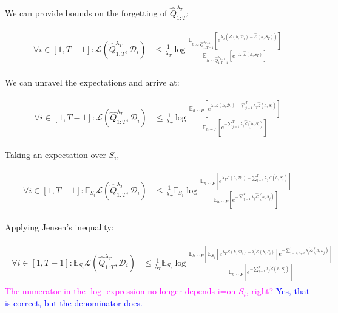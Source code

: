 \documentclass[letterpaper]{article}
\theoremstyle{definition}
\newcommand{\RM}[1]{{\textcolor{magenta}{#1}}}
\newcommand{\LF}[1]{{\textcolor{blue}{#1}}}
\begin{document}
We can provide bounds on the forgetting of $\hat{Q}^{\lambda_T}_{1:T}$:


\begin{align*} 
\begin{split}
\forall i\in[1,T-1]:
\mathcal{L}(\hat{Q}^{\lambda_T}_{1:T}, \mathcal{D}_i) &\leq \frac{1}{\lambda_T}\log\frac{\mathbb{E}_{h\sim \hat{Q}^{\lambda_{T-1}}_{1:T-1}}\left [e^{\lambda_T(\mathcal{L}(h,\mathcal{D}_i)-\hat{\mathcal{L}}(h,S_T))} \right ]}{\mathbb{E}_{h\sim \hat{Q}^{\lambda_{T-1}}_{1:T-1}}\left [e^{-\lambda_T\hat{\mathcal{L}}(h,S_T)} \right ]}
\end{split}
\end{align*}

We can unravel the expectations and arrive at:

\begin{align*} 
\begin{split}
\forall i\in[1,T-1]:
\mathcal{L}(\hat{Q}^{\lambda_T}_{1:T}, \mathcal{D}_i) &\leq \frac{1}{\lambda_T}\log\frac{\mathbb{E}_{h\sim P}\left [e^{\lambda_T\mathcal{L}(h,\mathcal{D}_i)-\sum_{j=1}^{T}\lambda_j\hat{\mathcal{L}}(h,S_j)} \right ]}{\mathbb{E}_{h\sim P}\left [e^{-\sum_{j=1}^{T}\lambda_j\hat{\mathcal{L}}(h,S_j)} \right ]}
\end{split}
\end{align*}

Taking an expectation over $S_i$,

\begin{align*} 
\begin{split}
\forall i\in[1,T-1]:
\mathbb{E}_{S_i}\mathcal{L}(\hat{Q}^{\lambda_T}_{1:T}, \mathcal{D}_i) &\leq \frac{1}{\lambda_T}\mathbb{E}_{S_i}\log\frac{\mathbb{E}_{h\sim P}\left [e^{\lambda_T\mathcal{L}(h,\mathcal{D}_i)-\sum_{j=1}^{T}\lambda_j\hat{\mathcal{L}}(h,S_j)} \right ]}{\mathbb{E}_{h\sim P}\left [e^{-\sum_{j=1}^{T}\lambda_j\hat{\mathcal{L}}(h,S_j)} \right ]}
\end{split}
\end{align*}

Applying Jensen's inequality:

\begin{align*} 
\begin{split}
\forall i\in[1,T-1]:
\mathbb{E}_{S_i}\mathcal{L}(\hat{Q}^{\lambda_T}_{1:T}, \mathcal{D}_i) &\leq \frac{1}{\lambda_T}\mathbb{E}_{S_i}\log\frac{\mathbb{E}_{h\sim P}\left [\mathbb{E}_{S_i}\left [e^{\lambda_T\mathcal{L}(h,\mathcal{D}_i)-\lambda_i\hat{\mathcal{L}}(h,S_i)} \right ]e^{-\sum_{j=1,j\neq i}^{T}\lambda_j\hat{\mathcal{L}}(h,S_j)} \right ]}{\mathbb{E}_{h\sim P}\left [e^{-\sum_{j=1}^{T}\lambda_j\hat{\mathcal{L}}(h,S_j)} \right ]}
\end{split}
\end{align*}
\RM{The numerator in the $\log$ expression no longer depends i=on $S_i$, right?} \LF{Yes, that is correct, but the denominator does.}
\end{document}
